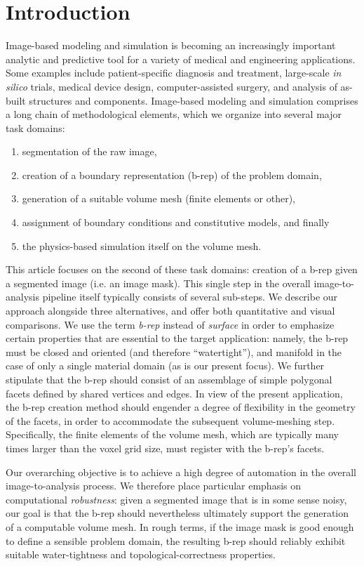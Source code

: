 \section{Introduction}

Image-based modeling and simulation is becoming an increasingly important analytic and predictive tool for a variety of medical and engineering applications. Some examples include patient-specific diagnosis and treatment, large-scale \textit{in silico} trials, medical device design, computer-assisted surgery, and analysis of as-built structures and components. Image-based modeling and simulation comprises a long chain of methodological elements, which we organize into several major task domains:  
\begin{enumerate}
\item
segmentation of the raw image, 
\item
creation of a boundary representation (b-rep) of the problem domain,
\item
generation of a suitable volume mesh (finite elements or other), 
\item
assignment
of boundary conditions and constitutive models, and finally 
\item
the physics-based
simulation itself on the volume mesh.
\end{enumerate}

This article focuses on the second of these task domains:  creation of a b-rep given a segmented image (i.e. an image mask).  
This single step in the overall 
image-to-analysis pipeline itself typically consists of several sub-steps.  
We describe our approach alongside three alternatives, and offer both quantitative and visual comparisons.  We use the term {\em b-rep} instead of {\em surface}
in order to emphasize certain properties that are essential to the target
application:  namely, the b-rep must be closed and oriented (and therefore
``watertight''), and manifold in the case of only a single material domain
(as is our present focus).  We further stipulate that the b-rep should consist of
an assemblage of simple polygonal facets defined by shared vertices and 
edges.  In view of the present application, the b-rep creation method should engender a degree of
flexibility in the geometry of the facets, in order to accommodate the subsequent
volume-meshing step.  Specifically, the finite elements of the
volume mesh, which are typically many times larger than the
voxel grid size, must register with the b-rep's facets.

Our overarching objective is to
achieve a high degree of automation in the overall image-to-analysis process.
We therefore place particular emphasis on 
computational {\em robustness}:  given a segmented image that is in some sense
noisy, our goal is that the b-rep should nevertheless ultimately support
the generation of a computable volume mesh.  In rough terms, if the
image mask is good enough to define a sensible problem domain, the resulting
b-rep should reliably exhibit suitable water-tightness
and topological-correctness properties.  

